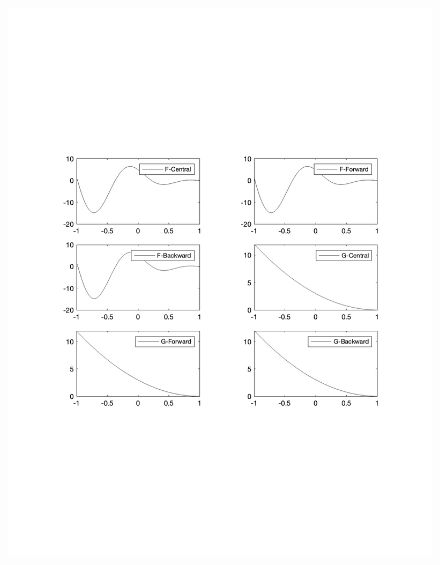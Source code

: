 \documentclass[12pt]{article}
\begin{document}
\begin{enumerate}[label=\bfseries Problem \arabic*:]
\begin{figure}[h]
\begin{minipage}{.5\textwidth}
        \includegraphics[width=\linewidth]{finite_difference_figure.pdf}
    \end{minipage}%
\end{figure}



\end{enumerate}
\end{document}
